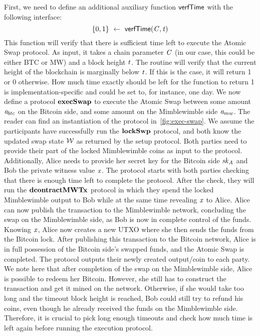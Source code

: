 First, we need to define an additional auxiliary function $\mathsf{verfTime}$ with the following interface:
\[ \{0,1\} ~\leftarrow~ \mathsf{verfTime} (\mathit{C},\mathit{t}) \]
This function will verify that there is sufficient time left to execute the Atomic Swap protocol.
As input, it takes a chain parameter $\mathit{C}$ (in our case, this could be either BTC or MW) and a block height $\mathit{t}$.
The routine will verify that the current height of the blockchain is marginally below $\mathit{t}$.
If this is the case, it will return 1 or 0 otherwise.
How much time exactly should be left for the function to return 1 is implementation-specific and could be set to, for instance, one day.
We now define a protocol $\mathbf{execSwap}$ to execute the Atomic Swap between some amount $\mathit{a}_{btc}$ on the Bitcoin side, and some amount on the Mimblewimble side $\mathit{a}_{mw}$.
The reader can find an instantiation of the protocol in~\cref{fig:exec-swap}.
We assume the participants have successfully run the $\mathbf{lockSwp}$ protocol, and both know the updated swap state $\mathcal{W}$ as returned by the setup protocol.
Both parties need to provide their part of the locked Mimblewimble coins as input to the protocol.
Additionally, Alice needs to provide her secret key for the Bitcoin side $\mathit{sk}_{\mathit{A}}$ and Bob the private witness value $\mathit{x}$.
The protocol starts with both parties checking that there is enough time left to complete the protocol.
After the check, they will run the $\mathbf{dcontractMWTx}$ protocol in which they spend the locked Mimblewimble output to Bob while at the same time revealing $\mathit{x}$ to Alice.
Alice can now publish the transaction to the Mimblewimble network, concluding the swap on the Mimblewimble side, as Bob is now in complete control of the funds.
Knowing $\mathit{x}$, Alice now creates a new UTXO where she then sends the funds from the Bitcoin lock.
After publishing this transaction to the Bitcoin network, Alice is in full possession of the Bitcoin side's swapped funds, and the Atomic Swap is completed.
The protocol outputs their newly created output/coin to each party.
We note here that after completion of the swap on the Mimblewimble side, Alice is possible to redeem her Bitcoin.
However, she still has to construct the transaction and get it mined on the network.
Otherwise, if she would take too long and the timeout block height is reached, Bob could still try to refund his coins, even though he already received the funds on the Mimblewimble side.
Therefore, it is crucial to pick long enough timeouts and check how much time is left again before running the execution protocol.

